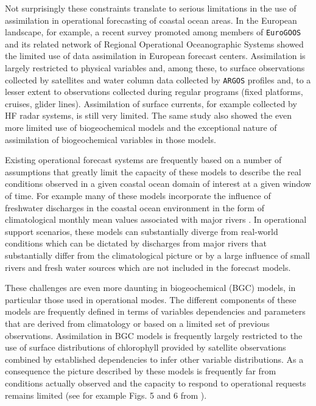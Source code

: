Not surprisingly these constraints translate to serious limitations in
the use of assimilation in operational forecasting of coastal ocean
areas. In the European landscape, for example, a recent survey
promoted among members of \texttt{EuroGOOS} and its related network of
Regional Operational Oceanographic Systems \cite{capet2020} showed the
limited use of data assimilation in European forecast
centers. Assimilation is largely restricted to physical variables and,
among these, to surface observations collected by satellites and water
column data collected by \texttt{ARGOS} profiles and, to a lesser
extent to observations collected during regular programs (fixed
platforms, cruises, glider lines). Assimilation of surface currents,
for example collected by HF radar systems, is still very limited. The
same study also showed the even more limited use of biogeochemical
models and the exceptional nature of assimilation of biogeochemical
variables in those models.
 
Existing operational forecast systems are frequently based on a number
of assumptions that greatly limit the capacity of these models to
describe the real conditions observed in a given coastal ocean domain
of interest at a given window of time. For example many of these
models incorporate the influence of freshwater discharges in the
coastal ocean environment in the form of climatological monthly mean
values associated with major rivers \cite{marta012}.  In operational
support scenarios, these models can substantially diverge from
real-world conditions which can be dictated by discharges from major
rivers that substantially differ from the climatological picture or by
a large influence of small rivers and fresh water sources which are
not included in the forecast models.
 
These challenges are even more daunting in biogeochemical (BGC)
models, in particular those used in operational modes. The different
components of these models are frequently defined in terms of
variables dependencies and parameters that are derived from
climatology or based on a limited set of previous
observations. Assimilation in BGC models is frequently largely
restricted to the use of surface distributions of chlorophyll provided
by satellite observations combined by established dependencies to
infer other variable distributions. As a consequence the picture
described by these models is frequently far from conditions actually
observed and the capacity to respond to operational requests remains
limited (see for example Figs. 5 and 6 from \cite{marta012}).
 
